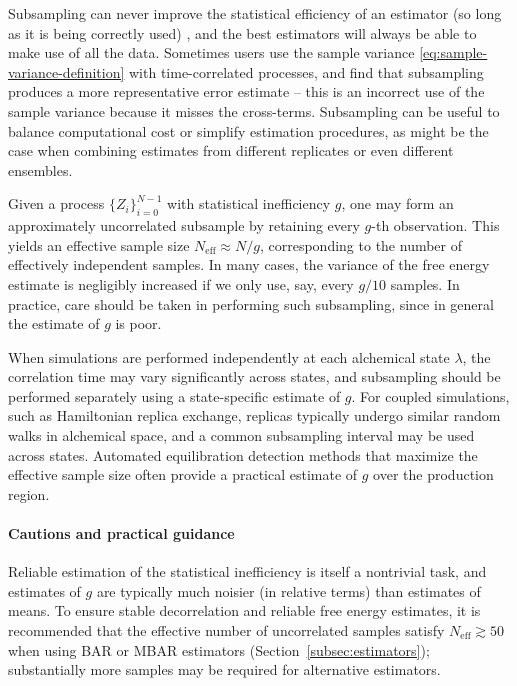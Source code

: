 \documentclass[9pt,bestpractices]{livecoms}
\begin{document}
Subsampling can never improve the statistical efficiency of an estimator (so long as it is being correctly used)  \cite{LinkEaton2012,maceachern1994subsampling,geyer1992practical}, and the best estimators will always be able to make use of all the data. Sometimes users use the sample variance \eqref{eq:sample-variance-definition} with time-correlated processes, and find that subsampling produces a more representative error estimate -- this is an incorrect use of the sample variance because it misses the cross-terms. Subsampling can be useful to balance computational cost or simplify estimation procedures, as might be the case when combining estimates from different replicates or even different ensembles. 

Given a process $\{Z_i\}_{i=0}^{N-1}$ with statistical inefficiency $g$, one may form an approximately uncorrelated subsample by retaining every $g$-th observation. This yields an effective sample size $N_{\mathrm{eff}} \approx N / g$, corresponding to the number of effectively independent samples. In many cases, the variance of the free energy estimate is negligibly increased if we only use, say, every $g/10$ samples. In practice, care should be taken in performing such subsampling, since in general the estimate of $g$ is poor. 

When simulations are performed independently at each alchemical state $\lambda$, the correlation time may vary significantly across states, and subsampling should be performed separately using a state-specific estimate of $g$. For coupled simulations, such as Hamiltonian replica exchange, replicas typically undergo similar random walks in alchemical space, and a common subsampling interval may be used across states. Automated equilibration detection methods that maximize the effective sample size often provide a practical estimate of $g$ over the production region.

\paragraph{Cautions and practical guidance}

Reliable estimation of the statistical inefficiency is itself a nontrivial task, and estimates of $g$ are typically much noisier (in relative terms) than estimates of means. To ensure stable decorrelation and reliable free energy estimates, it is recommended that the effective number of uncorrelated samples satisfy $N_{\mathrm{eff}} \gtrsim 50$ when using BAR or MBAR estimators (Section~\ref{subsec:estimators}); substantially more samples may be required for alternative estimators.
\end{document}
